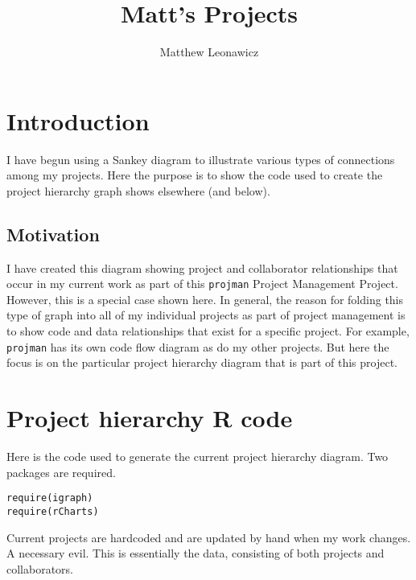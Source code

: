 \documentclass{article}\usepackage[]{graphicx}\usepackage[]{color}
\makeatletter
\newcommand{\hlstd}[1]{\textcolor[rgb]{0.514,0.58,0.588}{#1}}%
\newcommand{\hlkwd}[1]{\textcolor[rgb]{0.576,0.631,0.631}{#1}}%
\newenvironment{kframe}{%
 \def\at@end@of@kframe{}%
 \ifinner\ifhmode%
  \def\at@end@of@kframe{\end{minipage}}%
  \begin{minipage}{\columnwidth}%
 \fi\fi%
 \def\FrameCommand##1{\hskip\@totalleftmargin \hskip-\fboxsep
 \colorbox{shadecolor}{##1}\hskip-\fboxsep
     \hskip-\linewidth \hskip-\@totalleftmargin \hskip\columnwidth}%
 \MakeFramed {\advance\hsize-\width
   \@totalleftmargin\z@ \linewidth\hsize
   \@setminipage}}%
 {\par\unskip\endMakeFramed%
 \at@end@of@kframe}
\newenvironment{knitrout}{}{} %
\makeatother
\begin{document}
\title{Matt's Projects}
\author{Matthew Leonawicz}
\maketitle






\section{Introduction}
I have begun using a Sankey diagram to illustrate various types of connections among my projects.
Here the purpose is to show the code used to create the project hierarchy graph shows elsewhere (and below).

\subsection{Motivation}
I have created this diagram showing project and collaborator relationships that occur in my current work as part of this \texttt{projman} Project Management Project.
However, this is a special case shown here.
In general, the reason for folding this type of graph into all of my individual projects as part of project management
is to show code and data relationships that exist for a specific project.
For example, \texttt{projman} has its own code flow diagram as do my other projects.
But here the focus is on the particular project hierarchy diagram that is part of this project.

\section{Project hierarchy \textbf{R} code}
Here is the code used to generate the current project hierarchy diagram.
Two packages are required.

\begin{knitrout}
\color{fgcolor}\begin{kframe}
\begin{alltt}
\hlkwd{require}\hlstd{(igraph)}
\hlkwd{require}\hlstd{(rCharts)}
\end{alltt}
\end{kframe}
\end{knitrout}

Current projects are hardcoded and are updated by hand when my work changes. A necessary evil.
This is essentially the data, consisting of both projects and collaborators.
\end{document}
